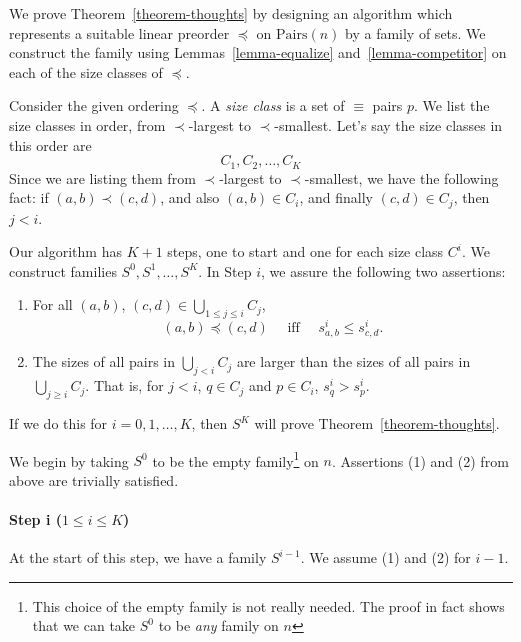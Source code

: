 \documentclass[12pt]{article}
\theoremstyle{definition}
\newcommand{\quadiff}{\quad \mbox{ iff } \quad}
\newcommand{\Pairs}{\mbox{Pairs}}
\begin{document}
We prove Theorem~\ref{theorem-thoughts} by designing an algorithm
which represents a suitable linear preorder $\preceq$ on $\Pairs(n)$ by a family
of sets.   We construct the family using Lemmas~\ref{lemma-equalize}
and~\ref{lemma-competitor} on each of the 
size classes of $\preceq$.


Consider the given ordering $\preceq$.
A \emph{size class} is a set of $\equiv$
 pairs $p$.   We list the size classes in order, from $\prec$-largest to 
 $\prec$-smallest.   Let's say the size classes in this order are 
 \[  C_1, C_2, \ldots, C_K \]
 Since we are listing them from 
 $\prec$-largest to 
 $\prec$-smallest, we have the following fact:
 if $(a,b) \prec (c,d)$, and also  $(a,b)\in C_i$, and finally
 $(c,d)\in C_j$,
 then $j < i$.
 
 Our algorithm has $K+1$ steps, one to start
 and one for each size class $C^i$. 
 We construct families $S^0, S^1, \ldots, S^K$.
 In Step $i$,
 we assure the following two assertions:
 \begin{enumerate}
 \item For all $(a,b)$, $(c,d)\in \bigcup_{1\leq j\leq i} C_j$,
\begin{equation}
    \label{goal-in-alg}
 (a,b) \preceq  (c,d) \quadiff 
 s^i_{a,b}\leq s^i_{c,d}.
 \end{equation}
     \item 
The sizes of all pairs in $\bigcup_{j< i} C_j$ are larger than the sizes of all pairs in $\bigcup_{j\geq i} C_j$.
   That is, for  $j < i$, $q\in C_j$ and $p\in C_i$, $s^i_q > s^i_p$.
 \end{enumerate}
 If we do this for $i = 0, 1, \ldots, K$, then $S^K$ will
 prove Theorem~\ref{theorem-thoughts}.
 
 We begin by taking $S^0$ to be the empty family\footnote{This
 choice of the empty family is not really needed.
 The proof in fact shows that we can take $S^0$ to be \emph{any}
 family on $n$}   on $n$.
 Assertions (1) and (2) from above are trivially satisfied.
 
 \paragraph{Step i ($1 \leq i \leq K$)}
 At the start of this step, we have a family $S^{i-1}$.
 We assume (1) and (2) for $i -1$.
 
\end{document}

